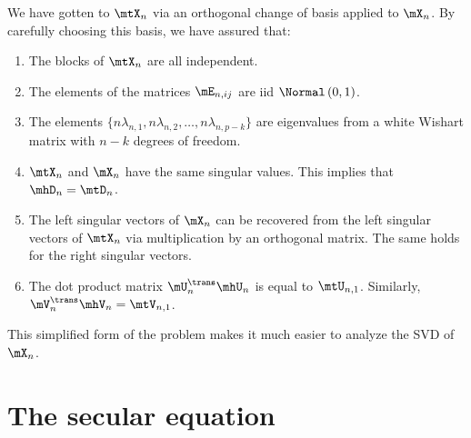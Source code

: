 We have gotten to $\mtX_n$ via an orthogonal change of basis applied to $\mX_n$.  By carefully choosing this basis, we have assured that:
\begin{enumerate}
    \item The blocks of $\mtX_n$ are all independent.
    \item The elements of the matrices $\mE_{n,ij}$ are 
        iid $\Normal\left( 0, 1 \right)$.
    \item The elements 
        $\{ n \lambda_{n,1}, n \lambda_{n,2}, \ldots, 
            n \lambda_{n,p-k} \}$ are eigenvalues from
        a white Wishart matrix with $n-k$ degrees of freedom.
    \item $\mtX_n$ and $\mX_n$ have the same singular values.  This implies
        that $\mhD_n = \mtD_n$.
    \item The left singular vectors of $\mX_n$ can be recovered from the
        left singular vectors of $\mtX_n$ via multiplication by an orthogonal
        matrix.  The same holds for the right singular vectors.
    \item The dot product matrix $\mU_n^\trans \mhU_n$ is equal to
        $\mtU_{n,1}$.
        Similarly, $\mV_n^\trans \mhV_n = \mtV_{n,1}$.
\end{enumerate}
This simplified form of the problem makes it much easier to analyze the 
SVD of $\mX_n$.


\section{The secular equation}\label{S:secular-equation}

